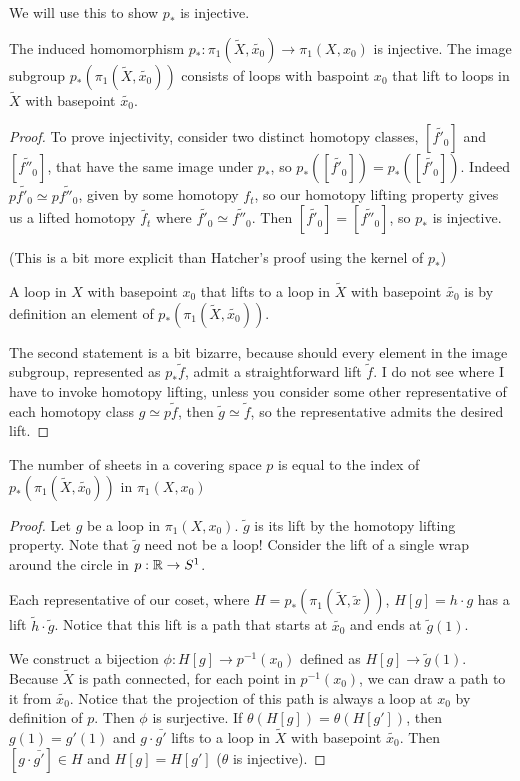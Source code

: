 \documentclass[10pt]{article}
\begin{document}
We will use this to show $p_*$ is injective.

\begin{proposition}
	The induced homomorphism $p_*: \pi_1(\tilde{X}, \tilde{x_0}) \to \pi_1(X,
	x_0)$ is injective. The image subgroup $p_*(\pi_1(\tilde{X}, \tilde{x_0}))$
	consists of loops with baspoint $x_0$ that lift to loops in $\tilde{X}$ with
	basepoint $\tilde{x_0}$.
\end{proposition}

\begin{proof}
	To prove injectivity, consider two distinct homotopy classes, $[\tilde{f'_0}]$
	and $[\tilde{f''_0}]$, that have the same image under $p_*$, so
	$p_*([\tilde{f'_0}]) = p_*([\tilde{f'_0}])$. Indeed $p\tilde{f'_0} \simeq
	p\tilde{f''_0}$, given by some homotopy $f_t$, so our homotopy lifting
	property gives us a lifted homotopy $\tilde{f_t}$ where $\tilde{f'_0} \simeq
	\tilde{f''_0}$. Then $[\tilde{f'_0}] = [\tilde{f''_0}]$, so $p_*$ is
	injective.

	(This is a bit more explicit than Hatcher's proof using the kernel of $p_*$)

	A loop in $X$ with basepoint $x_0$ that lifts to a loop in $\tilde{X}$ with
	basepoint $\tilde{x_0}$ is by definition an element of $p_*(\pi_1(\tilde{X},
	\tilde{x_0}))$.

	The second statement is a bit bizarre, because should every element in the
	image subgroup, represented as $p_*\tilde{f}$, admit a straightforward lift
	$\tilde{f}$. I do not see where I have to invoke homotopy lifting, unless you
	consider some other representative of each homotopy class $g \simeq
	p\tilde{f}$, then $\tilde{g} \simeq \tilde{f}$, so the representative admits
	the desired lift.
\end{proof}

\begin{proposition}
	The number of sheets in a covering space $p$ is equal to the index of
	$p_*(\pi_1(\tilde{X}, \tilde{x_0}))$ in $\pi_1(X, x_0)$
\end{proposition}

\begin{proof}
	Let $g$ be a loop in $\pi_1(X, x_0)$. $\tilde{g}$ is its lift by the homotopy
	lifting property. Note that $\tilde{g}$ need not be a loop! Consider the lift
	of a single wrap around the circle in $p: \mathbb{R} \to S^1$.

	Each representative of our coset, where $H = p_*(\pi_1(\tilde{X}, \tilde{x}))$,
	$H[g] = h\cdot g$ has a lift $\tilde{h}\cdot\tilde{g}$. Notice that this lift
	is a path that starts at $\tilde{x_0}$ and ends at $\tilde{g}(1)$.

	We construct a bijection $\phi: H[g] \to p^{-1}(x_0)$ defined as $H[g] \to
	\tilde{g}(1)$. Because $\tilde{X}$ is path connected, for each point in
	$p^{-1}(x_0)$, we can draw a path to it from $\tilde{x_0}$. Notice that the
	projection of this path is always a loop at $x_0$ by definition of $p$. Then
	$\phi$ is surjective. If $\theta(H[g]) = \theta(H[g'])$, then $g(1) = g'(1)$
	and $g \cdot \bar{g'}$ lifts to a loop in $\tilde{X}$ with basepoint
	$\tilde{x_0}$. Then $[g \cdot \bar{g'}] \in H$ and $H[g] = H[g']$ ($\theta$ is
	injective).
\end{proof}
\end{document}
